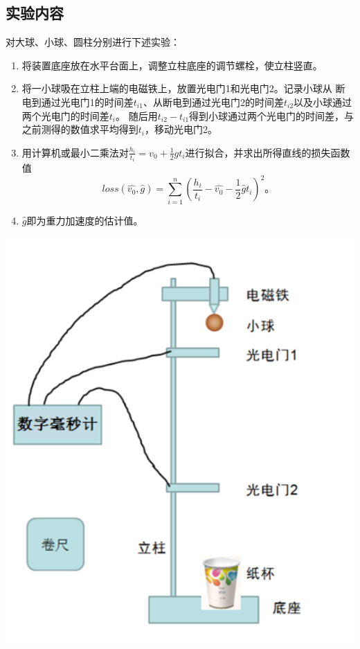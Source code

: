 \documentclass[UTF8]{ctexart}
\begin{document}
\subsection*{实验内容}
对大球、小球、圆柱分别进行下述实验：
\begin{enumerate}
    \item 将装置底座放在水平台面上，调整立柱底座的调节螺栓，使立柱竖直。
    \item 将一小球吸在立柱上端的电磁铁上，放置光电门1和光电门2。记录小球从
    断电到通过光电门1的时间差$t_{i1}$、从断电到通过光电门2的时间差$t_{i2}$以及小球通过两个光电门的时间差$t_{i}$。
    随后用$t_{i2}-t_{i1}$得到小球通过两个光电门的时间差，与
    之前测得的数值求平均得到$t_i$，移动光电门2。
    \item 用计算机或最小二乘法对$\frac{h_i}{t_i}=v_0+\frac{1}{2}gt_i$进行拟合，并求出所得直线的损失函数值
    \[loss\left( \hat{v_0},\hat{g} \right)=\sum_{i=1}^n\left(\frac{h_i}{t_i}-\hat{v_0}-\frac{1}{2}\hat{g}t_i\right)^2。\]
    \item $\hat{g}$即为重力加速度的估计值。
\end{enumerate}
\includegraphics[scale=0.5]{fig1.PNG}
\newpage
\end{document}

